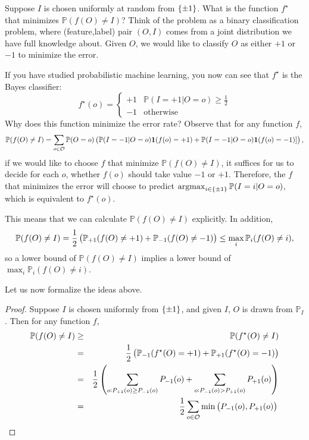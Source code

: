 \documentclass{article}
\DeclareMathOperator*{\argmax}{{\rm argmax}}
\newcommand{\PP}{\mathbb{P}}
\newcommand{\Ocal}{\mathcal{O}}
\newcommand*{\one}{{\bf 1}}
\begin{document}

Suppose $I$ is chosen uniformly at random from $\cbr{\pm 1}$.
What is the function $f^\star$ that minimizes $\PP(f(O) \neq I)$? Think of the problem
as a binary classification problem, where (feature,label) pair $(O,I)$ comes from a joint distribution we have full knowledge about. Given $O$, we would like to classify $O$ as either $+1$ or $-1$ to minimize the error.

If you have studied probabilistic machine learning, you now can see that $f^\star$ is the Bayes classifier:
\[ f^\star(o) = \begin{cases} +1 & \PP(I = +1|O=o) \geq \frac12 \\ -1 & \text{otherwise} \end{cases} \]
Why does this function minimize the error rate? Observe that for any function $f$,
\[ \PP(f(O) \neq I)
  = \sum_{o \in \Ocal} \PP(O = o) \del{\PP(I=-1|O=o) \one(f(o) = +1) + \PP(I=-1|O=o) \one(f(o) = -1)]}, \]
if we would like to choose $f$ that minimize $\PP(f(O) \neq I)$, it suffices for us to decide for each $o$, whether $f(o)$ should take value $-1$ or $+1$. Therefore, the $f$ that minimizes the error will choose to predict $\argmax_{i \in \cbr{\pm 1}} \PP(I=i|O=o)$, which is equivalent to $f^\star(o)$.


This means that we can calculate $\PP(f(O) \neq I)$ explicitly. In addition,
\begin{equation}
  \PP(f(O) \neq I) = \frac12 \del{\PP_{+1}(f(O) \neq +1) + \PP_{-1}(f(O) \neq -1)}
\leq \max_i \PP_{i}(f(O) \neq i),
\label{eqn:avg-worst}
\end{equation}
so a lower bound of $\PP(f(O) \neq I)$ implies a lower bound of $\max_i \PP_{i}(f(O) \neq i)$.

Let us now formalize the ideas above.

\begin{proof}
Suppose $I$ is chosen uniformly from $\cbr{\pm 1}$, and given $I$, $O$ is drawn from
$\PP_I$. Then for any function $f$,
\begin{eqnarray*}
  \PP(f(O) \neq I) &\geq& \PP(f^\star(O) \neq I) \\
   &=& \frac12 \del{\PP_{-1}(f^\star(O) = +1) + \PP_{+1}(f^\star(O) = -1)} \\
   &=& \frac12 \del{\sum_{o: P_{+1}(o) \geq P_{-1}(o)} P_{-1}(o) + \sum_{o: P_{-1}(o) > P_{+1}(o)} P_{+1}(o)} \\
   &=& \frac12 \sum_{o \in \Ocal} \min\del{P_{-1}(o), P_{+1}(o)}
   \qedhere
\end{eqnarray*}

\end{proof}
\end{document}
